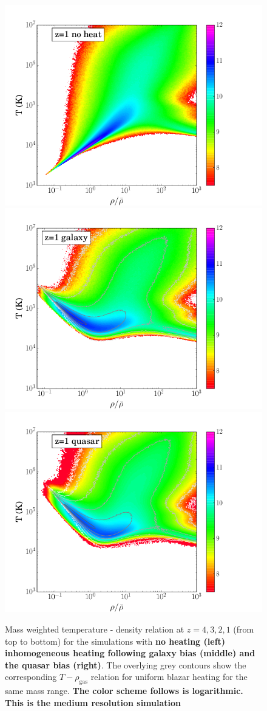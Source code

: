 \documentclass[numberedappendix]{emulateapj}
\newcommand\ALc[1]{{\color{red} \bf #1}} %
\begin{document}
\begin{figure}
\includegraphics[trim=.5cm 0cm 3cm .5cm, clip ,width = .32\textwidth ]{T_rho_noheat_z1.png}
\includegraphics[trim=.5cm 0cm 3cm .5cm, clip ,width = .32\textwidth ]{T_rho_gal_z1_256.png}
\includegraphics[trim=.5cm 0cm 3cm .5cm, clip ,width = .32\textwidth ]{T_rho_qso_z1_512.png}
\caption{Mass weighted temperature - density relation at $z=4,3,2,1$ (from top to bottom) for the simulations with \ALc{no heating (left) inhomogeneous heating following galaxy bias (middle) and the quasar bias (right)}. The overlying grey contours show the corresponding $T-\rho_{\mathrm{gas}}$ relation for uniform blazar heating \citep{2012MNRAS.423..149P} for the same mass range. \ALc{The color scheme follows is logarithmic. This is the medium resolution simulation}}
\label{fig:T_rho}
\end{figure}
\end{document}
